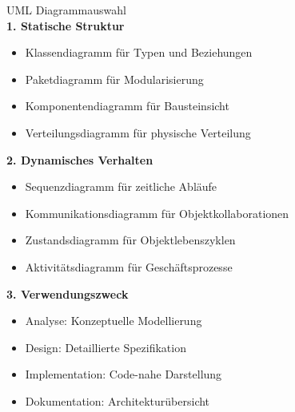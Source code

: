 \begin{KR}{UML Diagrammauswahl}\\
\textbf{1. Statische Struktur}
\begin{itemize}
    \item Klassendiagramm für Typen und Beziehungen
    \item Paketdiagramm für Modularisierung
    \item Komponentendiagramm für Bausteinsicht
    \item Verteilungsdiagramm für physische Verteilung
\end{itemize}

\textbf{2. Dynamisches Verhalten}
\begin{itemize}
    \item Sequenzdiagramm für zeitliche Abläufe
    \item Kommunikationsdiagramm für Objektkollaborationen
    \item Zustandsdiagramm für Objektlebenszyklen
    \item Aktivitätsdiagramm für Geschäftsprozesse
\end{itemize}

\textbf{3. Verwendungszweck}
\begin{itemize}
    \item Analyse: Konzeptuelle Modellierung
    \item Design: Detaillierte Spezifikation
    \item Implementation: Code-nahe Darstellung
    \item Dokumentation: Architekturübersicht
\end{itemize}
\end{KR}

